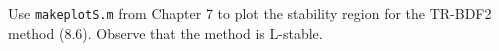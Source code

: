 

Use {\tt makeplotS.m} from Chapter 7 to plot the stability region for the
TR-BDF2 method (8.6).  Observe that the method is L-stable.

